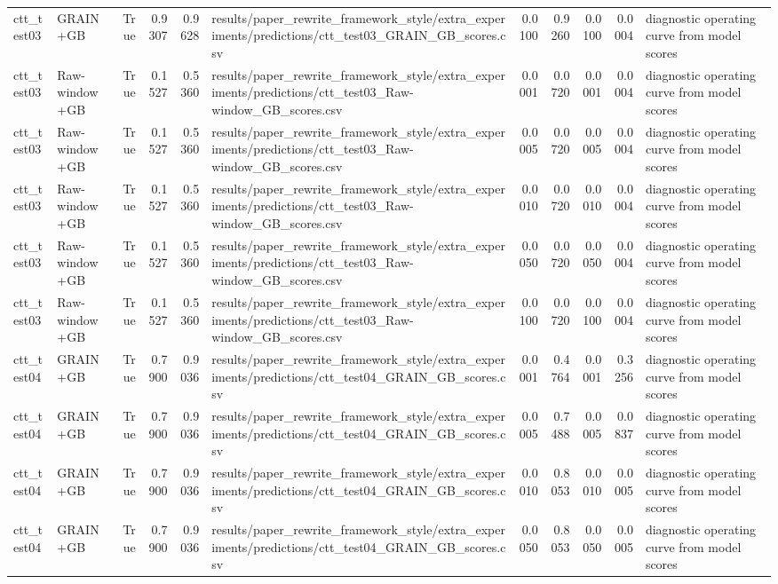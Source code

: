\begin{tabular}{llrrrlrrrrl}
ctt\_test03 & GRAIN+GB & True & 0.9307 & 0.9628 & results/paper\_rewrite\_framework\_style/extra\_experiments/predictions/ctt\_test03\_GRAIN\_GB\_scores.csv & 0.0100 & 0.9260 & 0.0100 & 0.0004 & diagnostic operating curve from model scores \\
ctt\_test03 & Raw-window+GB & True & 0.1527 & 0.5360 & results/paper\_rewrite\_framework\_style/extra\_experiments/predictions/ctt\_test03\_Raw-window\_GB\_scores.csv & 0.0001 & 0.0720 & 0.0001 & 0.0004 & diagnostic operating curve from model scores \\
ctt\_test03 & Raw-window+GB & True & 0.1527 & 0.5360 & results/paper\_rewrite\_framework\_style/extra\_experiments/predictions/ctt\_test03\_Raw-window\_GB\_scores.csv & 0.0005 & 0.0720 & 0.0005 & 0.0004 & diagnostic operating curve from model scores \\
ctt\_test03 & Raw-window+GB & True & 0.1527 & 0.5360 & results/paper\_rewrite\_framework\_style/extra\_experiments/predictions/ctt\_test03\_Raw-window\_GB\_scores.csv & 0.0010 & 0.0720 & 0.0010 & 0.0004 & diagnostic operating curve from model scores \\
ctt\_test03 & Raw-window+GB & True & 0.1527 & 0.5360 & results/paper\_rewrite\_framework\_style/extra\_experiments/predictions/ctt\_test03\_Raw-window\_GB\_scores.csv & 0.0050 & 0.0720 & 0.0050 & 0.0004 & diagnostic operating curve from model scores \\
ctt\_test03 & Raw-window+GB & True & 0.1527 & 0.5360 & results/paper\_rewrite\_framework\_style/extra\_experiments/predictions/ctt\_test03\_Raw-window\_GB\_scores.csv & 0.0100 & 0.0720 & 0.0100 & 0.0004 & diagnostic operating curve from model scores \\
ctt\_test04 & GRAIN+GB & True & 0.7900 & 0.9036 & results/paper\_rewrite\_framework\_style/extra\_experiments/predictions/ctt\_test04\_GRAIN\_GB\_scores.csv & 0.0001 & 0.4764 & 0.0001 & 0.3256 & diagnostic operating curve from model scores \\
ctt\_test04 & GRAIN+GB & True & 0.7900 & 0.9036 & results/paper\_rewrite\_framework\_style/extra\_experiments/predictions/ctt\_test04\_GRAIN\_GB\_scores.csv & 0.0005 & 0.7488 & 0.0005 & 0.0837 & diagnostic operating curve from model scores \\
ctt\_test04 & GRAIN+GB & True & 0.7900 & 0.9036 & results/paper\_rewrite\_framework\_style/extra\_experiments/predictions/ctt\_test04\_GRAIN\_GB\_scores.csv & 0.0010 & 0.8053 & 0.0010 & 0.0005 & diagnostic operating curve from model scores \\
ctt\_test04 & GRAIN+GB & True & 0.7900 & 0.9036 & results/paper\_rewrite\_framework\_style/extra\_experiments/predictions/ctt\_test04\_GRAIN\_GB\_scores.csv & 0.0050 & 0.8053 & 0.0050 & 0.0005 & diagnostic operating curve from model scores \\

\end{tabular}
